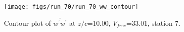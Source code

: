 \begin{figure}[H]
\centering
\texttt{[image: figs/run\_70/run\_70\_ww\_contour]}
\caption{Contour plot of $\overline{w^\prime w^\prime}$ at $z/c$=10.00, $V_{free}$=33.01, station 7.}
\end{figure}


